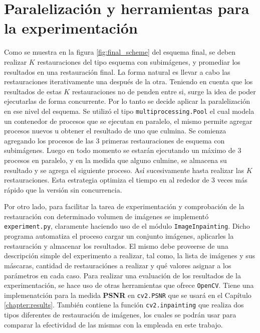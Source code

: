 \section{Paralelizaci\'on y herramientas para la experimentaci\'on}

Como se muestra en la figura \ref{fig:final_scheme} del esquema final, se deben realizar $K$ restauraciones del tipo esquema con subim\'agenes, y promediar los resultados en una restauraci\'on final. La forma natural es llevar a cabo las restauraciones iterativamente una despu\'es de la otra. Teniendo en cuenta que los resultados de estas $K$ restauraciones no de penden entre si, surge la idea de poder ejecutarlas de forma concurrente. Por lo tanto se decide aplicar la paralelizaci\'on en ese nivel del esquema. Se utiliz\'o el tipo \texttt{multiprocessing.Pool} el cual modela un contenedor de procesos que se ejecutan en paralelo, el mismo permite agregar procesos nuevos u obtener el resultado de uno que culmina. Se comienza agregando los procesos de las 3 primeras restauraciones de esquema con subim\'agenes. Luego en todo momento se estar\'an ejecutando un m\'aximo de 3 procesos en paralelo, y en la medida que alguno culmine, se almacena su resultado y se agrega el siguiente proceso. As\'i sucesivamente hasta realizar las $K$ restauraciones. Esta estrategia optimiza el tiempo en al rededor de 3 veces m\'as r\'apido que la versi\'on sin concurrencia.

Por otro lado, para facilitar la tarea de experimentaci\'on y comprobaci\'on de la restauraci\'on con determinado volumen de im\'agenes se implement\'o \texttt{experiment.py}, claramente haciendo uso de el m\'odulo \texttt{ImageInpainting}. Dicho programa automatiza el proceso cargar un conjunto im\'agenes, aplicarles la restauraci\'on y almacenar los resultados. El mismo debe proveerse de una descripci\'on simple del experimento a realizar, tal como, la lista de im\'agenes y sus m\'ascaras, cantidad de restauraci\'ones a realizar y qu\'e valores asignar a los par\'ametros en cada caso. Para realizar una evaluaci\'on de los resultados de la experimentaci\'on, se hace uso de otras herramientas que ofrece \texttt{OpenCV}. Tiene una implemenatci\'on para la medida \textbf{PSNR} \cite{enwiki:psnr} en \texttt{cv2.PSNR} que se usar\'a en el Cap\'itulo \ref{chapter:results}. Tambi\'en contiene la funci\'on \texttt{cv2.inpainting} que realiza dos tipos diferentes de restauraci\'on de im\'agenes, los cuales se podr\'an usar para comparar la efectividad de las mismas con la empleada en este trabajo.